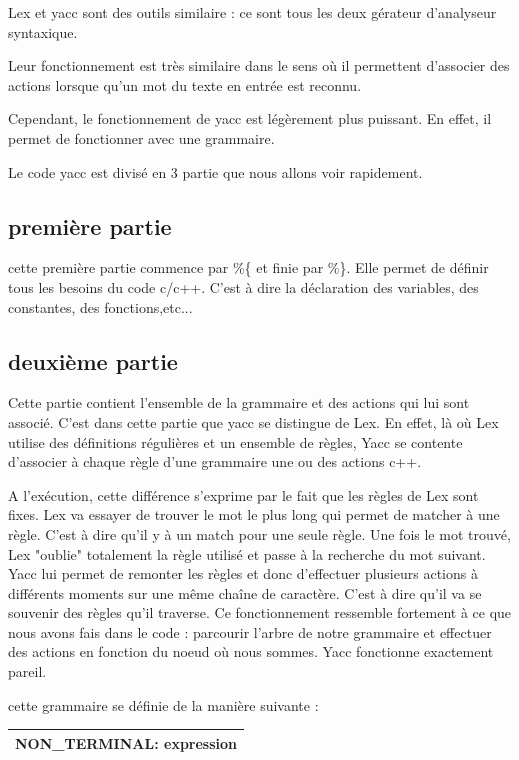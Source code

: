 Lex et yacc sont des outils similaire : ce sont tous les deux gérateur d’analyseur syntaxique.

Leur fonctionnement est très similaire dans le sens où il permettent d'associer des actions lorsque qu'un mot du texte en entrée est reconnu.

Cependant, le fonctionnement de yacc est légèrement plus puissant. En effet, il permet de fonctionner avec une grammaire.

Le code yacc est divisé en 3 partie que nous allons voir rapidement.

\subsection{première partie}
cette première partie commence par \%\{ et finie par \%\}. Elle permet de définir tous les besoins du code c/c++. C'est à dire la déclaration des variables, des constantes, des fonctions,etc...

\subsection{deuxième partie}
Cette partie contient l'ensemble de la grammaire et des actions qui lui sont associé. C'est dans cette partie que yacc se distingue de Lex.
En effet, là où Lex utilise des définitions régulières et un ensemble de règles, Yacc se contente d'associer à chaque règle d'une grammaire une ou des actions c++.

A l'exécution, cette différence s'exprime par le fait que les règles de Lex sont fixes. Lex va essayer de trouver le mot le plus long qui permet de matcher à une règle. C'est à dire qu'il y à un match pour une seule règle. Une fois le mot trouvé, Lex "oublie" totalement la règle utilisé et passe à la recherche du mot suivant.
Yacc lui permet de remonter les règles et donc d'effectuer plusieurs actions à différents moments sur une même chaîne de caractère. C'est à dire qu'il va se souvenir des règles qu'il traverse.
Ce fonctionnement ressemble fortement à ce que nous avons fais dans le code : parcourir l'arbre de notre grammaire et effectuer des actions en fonction du noeud où nous sommes. Yacc fonctionne exactement pareil.

cette grammaire se définie de la manière suivante : \newline

\begin{tabular}{|c|}
    \hline
        NON\_TERMINAL: expression \\
    \hline
\end{tabular}
\newline

